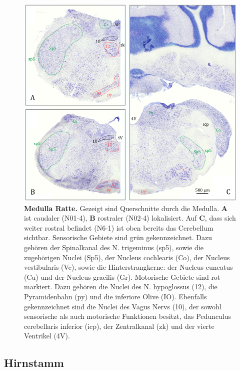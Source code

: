 \documentclass[12pt,a4paper,pdftex]{article}
\begin{document}
\begin{figure}[H]
    \centering
    \includegraphics[width=\textwidth]{pictures/Bilder_Jule/Ratte/medulla.png}
    \caption[Medulla Ratte]{\textbf{Medulla Ratte.} Gezeigt sind Querschnitte durch die Medulla. \textbf{A} ist caudaler (N01-4), \textbf{B} rostraler (N02-4) lokalisiert. Auf \textbf{C}, dass sich weiter rostral befindet (N6-1) ist oben bereits das Cerebellum sichtbar. Sensorische Gebiete sind grün gekennzeichnet. Dazu gehören der Spinalkanal des N. trigeminus (sp5), sowie die zugehörigen Nuclei (Sp5), der Nucleus cochlearis (Co), der Nucleus vestibularis (Ve), sowie die Hinterstrangkerne: der Nucleus cuneatus (Cu) und der Nucleus gracilis (Gr). Motorische Gebiete sind rot markiert. Dazu gehören die Nuclei des N. hypoglossus (12), die Pyramidenbahn (py) und die inferiore Olive (IO). Ebenfalls gekennzeichnet sind die Nuclei des Vagus Nervs (10), der sowohl sensorische als auch motorische Funktionen besitzt, das Pedunculus cerebellaris inferior (icp), der Zentralkanal (zk) und der vierte Ventrikel (4V).} 
    \label{fig:medulla_ratte}
\end{figure}{}


\subsection{Hirnstamm}
\label{subsec:Hirnstamm} 
\end{document}

